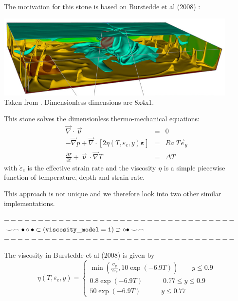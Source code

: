 


The motivation for this stone is based on Burstedde et al (2008) \cite{bugg08}:

\begin{center}
\includegraphics[width=12cm]{python_codes/fieldstone_88/images/bugg08}\\
{\captionfont Taken from \cite{bugg08}. Dimensionless dimensions are 8x4x1.}
\end{center}

This stone solves the dimensionless thermo-mechanical equations:
\begin{eqnarray}
\vec\nabla\cdot\vec\upnu &=& 0 \\
-\vec\nabla p + \vec\nabla \cdot [ 2 \eta(T,\dot{\varepsilon}_e,y) \dot{\bm \varepsilon} ] &=& Ra\; T \vec{e}_y \\
\frac{\partial T}{\partial t} + \vec\upnu \cdot \vec\nabla T &=& \Delta T
\end{eqnarray}
with $\dot{\varepsilon}_e$ is the effective strain rate and the viscosity $\eta$ is a simple
piecewise function of temperature, depth and strain rate.

This approach is not unique and we therefore look into two other similar implementations.

\begin{center}
$----------------------------------$\\
$\smile \frown \bullet \circ \bullet \subset ( {\tt viscosity\_model=1} ) \supset \circ \bullet \smile \frown$\\
$----------------------------------$
\end{center}

The viscosity in Burstedde et al (2008) \cite{bugg08} is given by 
\[
\eta(T,\dot{\varepsilon}_e,y) =
\left\{
\begin{array}{c}
\min \left(  \frac{\sigma_y}{2 \dot{\varepsilon}_e} , 10\exp(-6.9T)  \right) \qquad y\le 0.9 \\
0.8 \exp(-6.9T) \qquad\quad  0.77\le y \le 0.9 \\
50 \exp(-6.9T) \qquad\quad y \le 0.77 
\end{array}
\right.
\]

